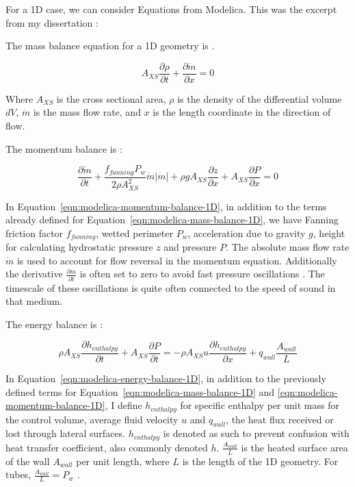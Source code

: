 \documentclass[masters]{ucbthesis}
\renewcommand{\_}{\kern-1.5pt\textunderscore\kern-1.5pt}
\begin{document}
For a 1D case, we can consider Equations from Modelica. This was 
the excerpt from my dissertation \citep{ong2024digital}:
\begin{framed}
	
The mass balance equation for a 1D geometry is \citep{Casella2003}.

\begin{equation} \label{eqn:modelica-mass-balance-1D}
	A_{XS} \frac{\partial \rho}{\partial t} + \frac{\partial \dot{m}}{\partial x} = 0
\end{equation}

Where $A_{XS}$ is the cross sectional area, $\rho$ is the density of 
the differential volume $dV$, $\dot{m}$ is the mass flow rate, and 
$x$ is the length coordinate in the direction of flow.

The momentum balance is \citep{Casella2003}:

\begin{equation} \label{eqn:modelica-momentum-balance-1D}
	\frac{\partial \dot{m}}{\partial t} 
	+ \frac{f_{fanning} P_w}{2 \rho A_{XS}^2} \dot{m} |\dot{m}|
	+ \rho g A_{XS} \frac{\partial z}{\partial x}
	+ A_{XS} \frac{\partial P}{\partial x} = 0
\end{equation}

In Equation~\ref{eqn:modelica-momentum-balance-1D}, in addition to the 
terms already defined for Equation~\ref{eqn:modelica-mass-balance-1D},
we have Fanning friction factor $f_{fanning}$, wetted perimeter $P_w$, 
acceleration due to gravity $g$, height for calculating hydrostatic pressure 
$z$ and pressure $P$. The absolute mass flow rate $\dot{m}$ is used to 
account for flow reversal in the momentum equation. Additionally 
the derivative $\frac{\partial \dot{m}}{\partial t}$ is often set to zero 
to avoid fast pressure oscillations \citep{Casella2003}. The timescale of 
these oscillations is quite often connected to the speed of sound in that 
medium. 

The energy balance is \citep{Casella2003}:

\begin{equation} \label{eqn:modelica-energy-balance-1D}
	\rho A_{XS} \frac{\partial h_{enthalpy}}{\partial t} 
	+ A_{XS} \frac{\partial P}{\partial t} = 
	- \rho A_{XS} u \frac{\partial h_{enthalpy}}{\partial x}
	+ q_{wall} \frac{A_{wall}}{L}
\end{equation}

In Equation~\ref{eqn:modelica-energy-balance-1D}, in addition to the previously 
defined terms for Equation~\ref{eqn:modelica-mass-balance-1D} and 
\ref{eqn:modelica-momentum-balance-1D}, I define $h_{enthalpy}$
for specific enthalpy per unit mass for the control volume, average 
fluid velocity $u$ and $q_{wall}$, the heat flux received or lost through 
lateral surfaces. $h_{enthalpy}$ is denoted as such to prevent confusion 
with heat transfer coefficient, also commonly denoted $h$. 
$\frac{A_{wall}}{L}$ is the heated surface area of the wall $A_{wall}$ 
per unit length, where $L$ is the length of the 1D geometry. For tubes,
$\frac{A_{wall}}{L} = P_w$ \citep{Casella2003}.
\end{framed}
\end{document}
